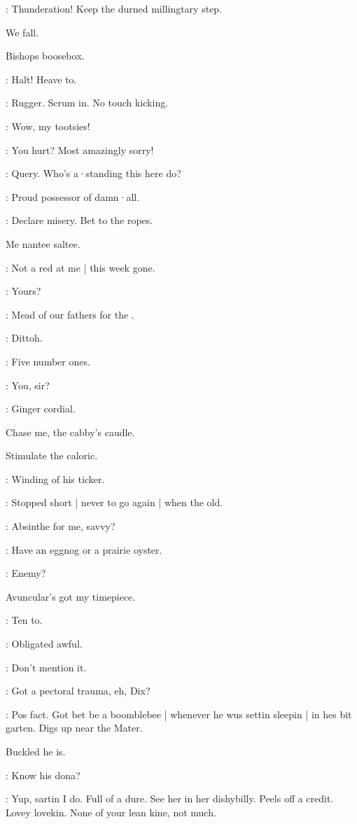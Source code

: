\lenehan:
Thunderation!
Keep the durned millingtary step.

We fall.

Bishops boosebox.

\punch:
Halt!
Heave to.

\dixon:
Rugger.
Scrum in.
No touch kicking.

\lynch:
Wow,
my tootsies!

\dixon:
You hurt?
Most amazingly sorry!


\lenehan:
Query.
Who's a·standing this here do?

\madden:
Proud possessor of damn·all.

\lynch:
Declare misery.
Bet to the ropes.

Me nantee saltee.

\dixon:
Not a red at me |
this week gone.

\barman:
Yours?

\stephen:
Mead of our fathers for the .

\bannon:
Dittoh.

\stephen:
Five number ones.

\barman:
You,
sir?

\Bloom:
Ginger cordial.

Chase me,
the cabby's caudle.

Stimulate the caloric.

:
Winding of his ticker.

\Bloom:
Stopped short |
never to go again |
when the old.

\stephen:
Absinthe for me,
savvy?

\mulligan:
 Have an eggnog or a prairie oyster.

\Bloom:
Enemy?

Avuncular's got my timepiece.

\madden:
Ten to.

\Bloom:
Obligated awful.

\madden:
Don't mention it.

\lynch:
Got a pectoral trauma,
eh,
Dix?

\dixon:
Pos fact.
Got bet be a boomblebee |
whenever he wus settin sleepin |
in hes bit garten.
Digs up near the Mater.

Buckled he is.

\mulligan:
Know his dona?

\dixon:
Yup,
sartin I do.
Full of a dure.
See her in her dishybilly.
Peels off a credit.
Lovey lovekin.
None of your lean kine,
not much.

